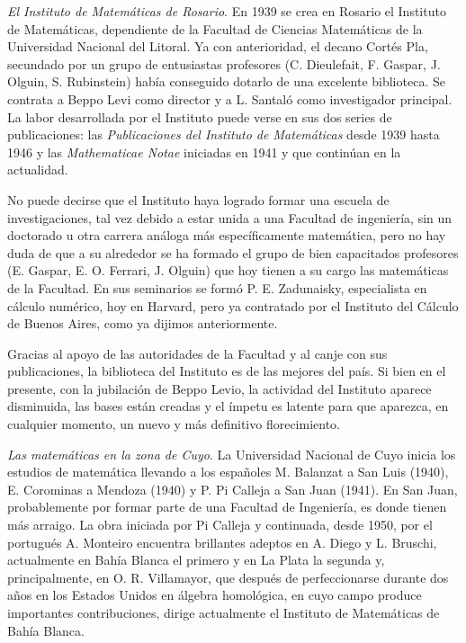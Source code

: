 \emph{El Instituto de Matemáticas de Rosario}. En 1939 se crea en Rosario el
Instituto de Matemáticas, dependiente de la Facultad de Ciencias Matemáticas de
la Universidad Nacional del Litoral. Ya con anterioridad, el decano Cortés Pla,
secundado por un grupo de entusiastas profesores (C. Dieulefait, F. Gaspar, J.
Olguin, S. Rubinstein) había conseguido dotarlo de una excelente biblioteca. Se
contrata a Beppo Levi como director y a L. Santaló como investigador principal.
La labor desarrollada por el Instituto puede verse en sus dos series de
publicaciones: las \emph{Publicaciones del Instituto de Matemáticas} desde 1939
hasta 1946 y las \emph{Mathematicae Notae} iniciadas en 1941 y que continúan en
la actualidad.

No puede decirse que el Instituto haya logrado formar una escuela de
investigaciones, tal vez debido a estar unida a una Facultad de ingeniería, sin
un doctorado u otra carrera análoga más específicamente matemática, pero no hay
duda de que a su alrededor se ha formado el grupo de bien capacitados
profesores (E. Gaspar, E. O. Ferrari, J. Olguin) que hoy tienen a su cargo las
matemáticas de la Facultad. En sus seminarios se formó P. E. Zadunaisky,
especialista en cálculo numérico, hoy en Harvard, pero ya contratado por el
Instituto del Cálculo de Buenos Aires, como ya dijimos anteriormente. 

Gracias al apoyo de las autoridades de la Facultad y al canje con sus
publicaciones, la biblioteca del Instituto es de las mejores del país. Si bien
en el presente, con la jubilación de Beppo Levio, la actividad del Instituto
aparece disminuida, las bases están creadas y el ímpetu es latente para que
aparezca, en cualquier momento, un nuevo y más definitivo florecimiento.

\emph{Las matemáticas en la zona de Cuyo}. La Universidad Nacional de Cuyo
inicia los estudios de matemática llevando a los españoles M. Balanzat a San
Luis (1940), E. Corominas a Mendoza (1940) y P. Pi Calleja a San Juan (1941).
En San Juan, probablemente por formar parte de una Facultad de Ingeniería, es
donde tienen más arraigo. La obra iniciada por Pi Calleja y continuada, desde
1950, por el portugués A. Monteiro encuentra brillantes adeptos en A. Diego y
L. Bruschi, actualmente en Bahía Blanca el primero y en La Plata la segunda y,
principalmente, en O. R. Villamayor, que después de perfeccionarse durante dos
años en los Estados Unidos en álgebra homológica, en cuyo campo produce
importantes contribuciones, dirige actualmente el Instituto de Matemáticas de
Bahía Blanca. 

